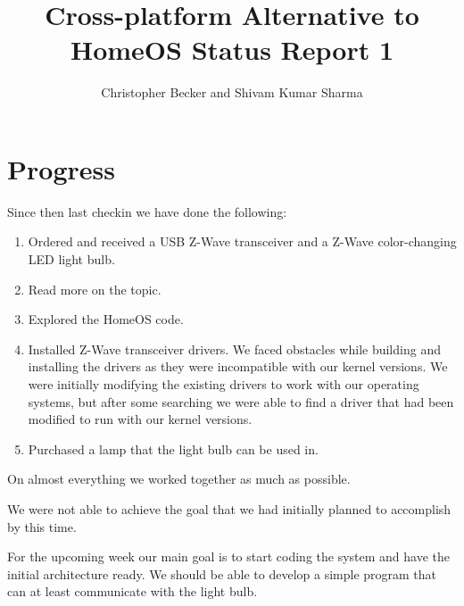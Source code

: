 \documentclass[letterpaper,12pt]{article}
\title{Cross-platform Alternative to HomeOS Status Report 1}
\author{Christopher Becker and Shivam Kumar Sharma}
\begin{document}
\maketitle

\section*{Progress}
Since then last checkin we have done the following:
\begin{enumerate}
 \item Ordered and received a USB Z-Wave transceiver and a Z-Wave color-changing LED light bulb.
 \item Read more on the topic.
 \item Explored the HomeOS code.
 \item Installed Z-Wave transceiver drivers. We faced obstacles while building and installing the drivers as they were incompatible with our kernel versions. We were initially modifying the existing drivers to work with our operating systems, but after some searching we were able to find a driver that had been modified to run with our kernel versions.
 \item Purchased a lamp that the light bulb can be used in.
\end{enumerate}
On almost everything we worked together as much as possible.

We were not able to achieve the goal that we had initially planned to accomplish by this time.

For the upcoming week our main goal is to start coding the system and have the initial architecture ready. We should be able to develop a simple program that can at least communicate with the light bulb.
\end{document}
